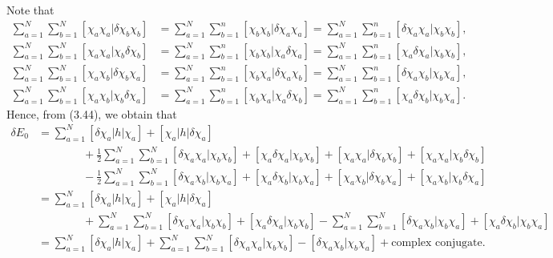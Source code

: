 \documentclass[a4paper]{book}
\newcounter{solution}[chapter]
\begin{document}
	\begin{solution}
	
	Note that
	\begin{align*}
		\sum_{ a=1 }^N \sum_{ b=1 }^N [ \chi_a \chi_a | \delta \chi_b \chi_b ] &= \sum_{ a=1 }^N \sum_{ b=1 }^n [ \chi_b \chi_b | \delta \chi_a \chi_a ] = \sum_{ a=1 }^N \sum_{ b=1 }^n [ \delta \chi_a \chi_a | \chi_b \chi_b ] , \\
		\sum_{ a=1 }^N \sum_{ b=1 }^N [ \chi_a \chi_a |  \chi_b \delta \chi_b ] &= \sum_{ a=1 }^N \sum_{ b=1 }^n [ \chi_b \chi_b | \chi_a \delta \chi_a ] = \sum_{ a=1 }^N \sum_{ b=1 }^n [ \chi_a \delta \chi_a | \chi_b \chi_b ] , \\
		\sum_{ a=1 }^N \sum_{ b=1 }^N [ \chi_a \chi_b | \delta  \chi_b \chi_a ] &= \sum_{ a=1 }^N \sum_{ b=1 }^n [ \chi_b \chi_a | \delta \chi_a \chi_b ] = \sum_{ a=1 }^N \sum_{ b=1 }^n [ \delta \chi_a \chi_b | \chi_b \chi_a ] , \\
		\sum_{ a=1 }^N \sum_{ b=1 }^N [ \chi_a \chi_b | \chi_b \delta \chi_a ] &= \sum_{ a=1 }^N \sum_{ b=1 }^n [ \chi_b \chi_a | \chi_a \delta \chi_b ] = \sum_{ a=1 }^N \sum_{ b=1 }^n [ \chi_a \delta \chi_b | \chi_b \chi_a ] .
	\end{align*}
	Hence, from (3.44), we obtain that
	\begin{align*}
		\delta E_0 &= \sum_{ a=1 }^N [ \delta \chi_a | h | \chi_a ] + [ \chi_a | h | \delta \chi_a ] \\
		&\hspace{4em} + \frac{1}{2} \sum_{ a=1 }^N \sum_{ b=1 }^N [ \delta \chi_a \chi_a | \chi_b \chi_b ] + [ \chi_a \delta \chi_a | \chi_b \chi_b ] + [ \chi_a \chi_a |  \delta \chi_b \chi_b ] + [ \chi_a \chi_a | \chi_b \delta \chi_b ] \\
		&\hspace{4em} - \frac{1}{2} \sum_{ a=1 }^N \sum_{ b=1 }^N [ \delta \chi_a \chi_b | \chi_b \chi_a ] + [ \chi_a \delta \chi_b | \chi_b \chi_a ] + [ \chi_a \chi_b |  \delta \chi_b \chi_a ] + [ \chi_a \chi_b | \chi_b \delta \chi_a ] \\
		&= \sum_{ a=1 }^N [ \delta \chi_a | h | \chi_a ] + [ \chi_a | h | \delta \chi_a ] \\
		&\hspace{4em} + \sum_{ a=1 }^N \sum_{ b=1 }^N [ \delta \chi_a \chi_a | \chi_b \chi_b ] + [ \chi_a \delta \chi_a | \chi_b \chi_b ] - \sum_{ a=1 }^N \sum_{ b=1 }^N [ \delta \chi_a \chi_b | \chi_b \chi_a ] + [ \chi_a \delta \chi_b | \chi_b \chi_a ] \\
		&= \sum_{a=1}^N [\delta \chi_a | h | \chi_a ] + \sum_{a=1}^N \sum_{b=1}^N [\delta \chi_a \chi_a | \chi_b \chi_b] - [\delta \chi_a \chi_b | \chi_b \chi_a] + \text{complex conjugate}.
	\end{align*}
	
	\end{solution}
	
\end{document}
